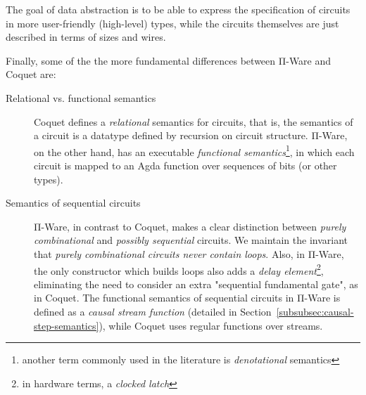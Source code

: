             The goal of data abstraction is to be able to express the specification of circuits in
            more user-friendly (high-level) types, while the circuits themselves are just described
            in terms of sizes and wires.

            Finally, some of the the more fundamental differences between Π-Ware and Coquet are:

            \begin{description}
                \item[Relational vs. functional semantics]
                    Coquet defines a \emph{relational} semantics for circuits,
                    that is, the semantics of a circuit is a datatype defined by recursion on circuit structure.
                    Π-Ware, on the other hand, has an executable
                    \emph{functional semantics}\footnote{another term commonly used in the literature is \emph{denotational} semantics},
                    in which each circuit is mapped to an Agda function over sequences of bits (or other types).
                \item[Semantics of sequential circuits]
                    Π-Ware, in contrast to Coquet, makes a clear distinction between \emph{purely combinational}
                    and \emph{possibly sequential} circuits.
                    We maintain the invariant that \emph{purely combinational circuits never contain loops}.
                    Also, in Π-Ware, the only constructor which builds loops also adds a
                    \emph{delay element}\footnote{in hardware terms, a \emph{clocked latch}},
                    eliminating the need to consider an extra "sequential fundamental gate", as in Coquet.
                    The functional semantics of sequential circuits in Π-Ware is defined as a \emph{causal stream function}
                    (detailed in Section~\ref{subsubsec:causal-step-semantics}), while Coquet uses regular functions over streams.
            \end{description}

